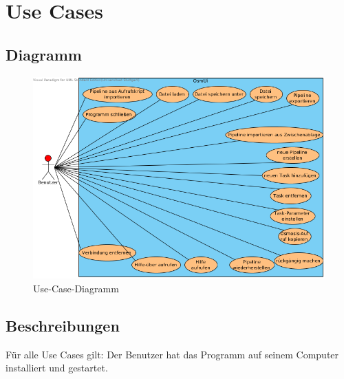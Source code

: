 \documentclass[a4paper,12pt]{scrartcl}
\begin{document}
\section{Use Cases}
\subsection{Diagramm}
\begin{center}
\begin{figure}[h!]
\begin{center}
\includegraphics[width=15cm]{Use-Cases.png}
\caption{Use-Case-Diagramm}
\end{center}
\end{figure}
\end{center}
\newpage
\subsection{Beschreibungen}
Für alle Use Cases gilt: Der Benutzer hat das Programm auf seinem Computer installiert und gestartet.
\end{document}
